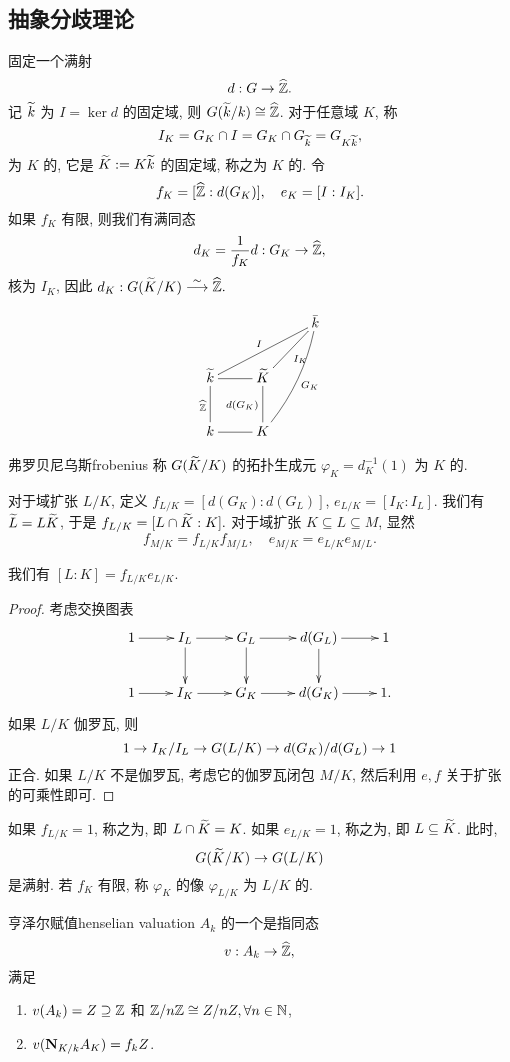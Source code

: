 \subsection{抽象分歧理论}
固定一个满射
  \[d:G\to \widehat {{\mathbb{Z}}}.\]
记 $\widetilde k$ 为 $I=\ker d$ 的固定域, 则 $G(\widetilde k/k)\cong \widehat {{\mathbb{Z}}}$.
对于任意域 $K$, 称 
  \[I_K=G_K\cap I=G_K\cap G_{\widetilde k}=G_{K\widetilde k},\]
为 $K$ 的, 它是 $\widetilde K:=K\widetilde k$ 的固定域, 称之为 $K$ 的. 令
  \[f_K=[\widehat {{\mathbb{Z}}}:d(G_K)],\quad e_K=[I:I_K].\]
如果 $f_K$ 有限, 则我们有满同态
  \[d_K=\frac{1}{f_K}d:G_K\to \widehat {{\mathbb{Z}}},\]
核为 $I_K$, 因此 $d_K:G(\widetilde K/K)\stackrel{\sim}{\longrightarrow} \widehat {{\mathbb{Z}}}.$

  \[\xymatrix{
&& \bar k\\
\wt k\ar@{-}[r]\ar@{-}[rru]^I & \wt K\ar@{-}[ru]_{I_K} &\\
k\ar@{-}[r]\ar@{-}[u]^{\wh \BZ}& K \ar@{-}[u]^{d(G_K)}\ar@/_/@{-}[ruu]_{G_K}&
}\]

\begin{definition}{弗罗贝尼乌斯}{frobenius}
称 $G(\widetilde K/K)$ 的拓扑生成元 $\varphi_K=d_K^{-1}(1)$ 为 $K$ 的.
\end{definition}

对于域扩张 $L/K$, 定义 $f_{L/K}=[d(G_K):d(G_L)]$, $e_{L/K}=[I_K:I_L]$.
我们有 $\widetilde L=L\widetilde K$, 于是 $f_{L/K}=[L\cap \widetilde K:K].$
对于域扩张 $K\subseteq L\subseteq M$, 显然
  \[f_{M/K}=f_{L/K}f_{M/L},\quad
e_{M/K}=e_{L/K}e_{M/L}.\]

\begin{proposition}{}{}
我们有 $[L:K]=f_{L/K}e_{L/K}$.
\end{proposition}
\begin{proof}
考虑交换图表
  \[\xymatrix{
    1\ar[r] & I_L\ar[r]\ar[d] & G_L\ar[r]\ar[d] & d(G_L)\ar[r]\ar[d] &1\\
    1\ar[r] & I_K\ar[r] & G_K\ar[r] & d(G_K)\ar[r] &1.
  }\]
如果 $L/K$ 伽罗瓦, 则
  \[1\rightarrow I_K/I_L\rightarrow G(L/K)\rightarrow d(G_K)/d(G_L)\rightarrow 1\]
正合. 如果 $L/K$ 不是伽罗瓦, 考虑它的伽罗瓦闭包 $M/K$, 然后利用 $e,f$ 关于扩张的可乘性即可. 
\end{proof}

如果 $f_{L/K}=1$, 称之为, 即 $L\cap \widetilde K=K$.
如果 $e_{L/K}=1$, 称之为, 即 $L\subseteq \widetilde K$.
此时,
  \[G(\widetilde K/K)\rightarrow G(L/K)\]
是满射. 若 $f_K$ 有限, 称 $\varphi_K$ 的像 $\varphi_{L/K}$ 为 $L/K$ 的.

\begin{definition}{亨泽尔赋值}{henselian valuation}
$A_k$ 的一个是指同态
  \[v:A_k\to \widehat {{\mathbb{Z}}},\]
满足
\begin{enumerate}
\item $v(A_k)=Z\supseteq {\mathbb{Z}}$ 和 ${\mathbb{Z}}/n{\mathbb{Z}}\cong Z/nZ, \forall n\in {\mathbb{N}}$,
\item $v({\mathbf{N}}_{K/k}A_K)=f_kZ$.
\end{enumerate}
\end{definition}


